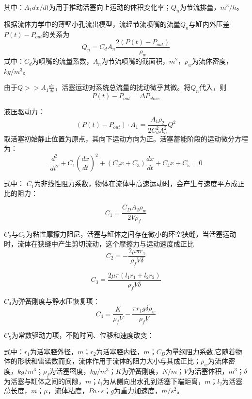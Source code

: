 其中：$A_1dx/dt$为用于推动活塞向上运动的体积变化率；$Q_n$为节流排量，$m^3/h$。

根据流体力学中的薄壁小孔流出模型，流经节流喷嘴的流量$Q_n$与缸内外压差$P(t)-P_{out}$的关系为
\begin{equation}
	Q_n=C_dA_n\frac{2(P(t)-P_{out})}{\rho_w}
\end{equation}
式中：$C_d$为喷嘴的流量系数，$A_n$为节流喷嘴的截面积，$m^2$，$\rho_w$为流体密度，$kg/m^3$。

由于$Q>>A_1\frac{dx}{dt}$，活塞运动对系统总流量的扰动微乎其微。将$Q_n$代入，则
\begin{equation}
	P(t)-P_{out}=\Delta P_{close}
\end{equation}


液压驱动力：
\begin{equation}
	\left(P(t)-P_{out}\right)\cdot A_1=\frac{A_1\rho_2}{2C_d^2A_n^2}Q^2
\end{equation}
取活塞初始静止位置为原点，其向下运动方向为正。活塞蓄能阶段的运动微分方程为：
\begin{equation}
	\frac{d^2}{dt^2}+C_1\left(\frac{dx}{dt}\right)^2+\left(C_2 x+C_3\right)\frac{dx}{dt}+C_4 x+ C_5 =0
\end{equation}

式中： $C_1$为非线性阻力系数，物体在流体中高速运动时，会产生与速度平方成正比的阻力：

\begin{equation}
	C_1=\frac{C_DA_2\rho_w}{2V\rho_f}
\end{equation}

$C_2$与$C_3$为粘性摩擦力阻尼，活塞与缸体之间存在微小的环空狭缝，当活塞运动时，流体在狭缝中产生剪切流动，这个摩擦力与运动速度成正比
\begin{equation}
	C_2=-\frac{2\mu\pi r_1}{\rho_f V\delta}
\end{equation}

\begin{equation}
	C_3=\frac{2\mu\pi\left(l_1r_1+l_2r_2\right)}{\rho_f V \delta}
\end{equation}


$C_4$为弹簧刚度与静水压恢复项：
\begin{equation}
	C_4=\frac{K}{\rho_f V}-\frac{\pi r_1 g \delta \rho_w}{\rho_f V}
\end{equation}

 $C_5$为常数驱动力项，不随时间、位移和速度改变：
 
 式中：$r_1$为活塞腔外径，$m$；$r_2$为活塞腔内径，$m$；$C_D$为量纲阻力系数,它随着物体的形状和雷诺数而变，流体作用于流体的阻力大小与其成正比；$\rho_w$为流体密度，$kg/m^3$；$\rho_f$为活塞密度，$kg/m^3$；$K$为弹簧刚度，$N/m$；$V$为活塞体积，$m^3$；$\delta$为活塞与缸体之间的间隙，$m$；$l_1$为从侧向出水孔到活塞下端距离，$m$；$l_2$为活塞总长度，$m$；$\mu $，流体粘度，$Pa\cdot s$；$g$为重力加速度，$m/s^2$。
 
